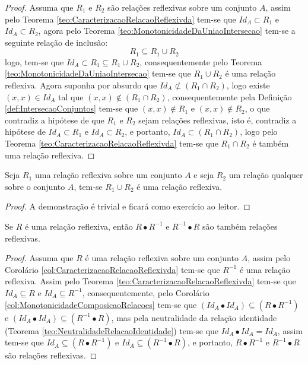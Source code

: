\begin{proof}
	Assuma que $R_1$ e $R_2$ são relações reflexivas sobre um conjunto $A$, assim pelo Teorema \ref{teo:CaracterizacaoRelacaoReflexivda} tem-se que $Id_A \subset R_1$ e $Id_A \subset R_2$, agora pelo Teorema \ref{teo:MonotonicidadeDaUniaoIntersecao} tem-se a seguinte relação de inclusão:
	$$R_1 \subseteq R_1 \cup R_2$$
	logo, tem-se que $Id_A \subset R_1 \subseteq R_1 \cup R_2$, consequentemente pelo Teorema \ref{teo:MonotonicidadeDaUniaoIntersecao} tem-se que $R_1 \cup R_2$ é uma relação reflexiva. Agora suponha por absurdo que $Id_A \not\subset (R_1 \cap R_2)$, logo existe $(x, x) \in Id_A$ tal que $(x, x) \notin (R_1 \cap R_2)$, consequentemente pela Definição \ref{def:IntersecaoConjuntos} tem-se que $(x, x) \notin R_1$ e $(x, x) \notin R_2$, o que contradiz a hipótese de que $R_1$ e $R_2$ sejam relações reflexivas, isto é, contradiz a hipótese de $Id_A \subset R_1$ e $Id_A \subset R_2$, e portanto, $Id_A \subset (R_1 \cap R_2)$, logo pelo Teorema \ref{teo:CaracterizacaoRelacaoReflexivda} tem-se que $R_1 \cap R_2$ é também uma relação reflexiva.
\end{proof}

\begin{theorem}
	Seja $R_1$ uma relação reflexiva sobre um conjunto $A$ e seja $R_2$ um relação qualquer sobre o conjunto $A$, tem-se $R_1 \cup R_2$ é uma relação reflexiva.
\end{theorem}

\begin{proof}
	A demonstração é trivial e ficará como exercício ao leitor.
\end{proof}

\begin{theorem}
	Se $R$ é uma relação reflexiva, então $R \bullet R^{-1}$ e $R^{-1} \bullet R$ são também relações reflexivas.
\end{theorem}

\begin{proof}
	Assuma que $R$ é uma relação reflexiva sobre um conjunto $A$, assim pelo Corolário \ref{col:CaracterizacaoRelacaoReflexivda} tem-se que $R^{-1}$ é uma relação reflexiva. Assim pelo Teorema \ref{teo:CaracterizacaoRelacaoReflexivda} tem-se que $Id_A \subseteq R$ e $Id_A \subseteq R^{-1}$, consequentemente, pelo Corolário \ref{col:MonotonicidadeComposicaoRelacoes} tem-se que $(Id_A \bullet Id_A) \subseteq (R \bullet R^{-1})$ e $(Id_A \bullet Id_A) \subseteq (R^{-1} \bullet R)$, mas pela neutralidade da relação identidade (Teorema \ref{teo:NeutralidadeRelacaoIdentidade}) tem-se que $Id_A \bullet Id_A = Id_A$, assim tem-se que  $Id_A \subseteq (R \bullet R^{-1})$ e $Id_A \subseteq (R^{-1} \bullet R)$, e portanto, $R \bullet R^{-1}$ e $R^{-1} \bullet R$ são relações reflexivas.
\end{proof}

